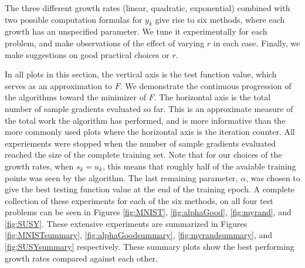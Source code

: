 \documentclass[11pt]{article}
\begin{document}
   The three different growth rates (linear, quadratic, exponential) combined with two possible computation formulas for $y_k$ give rise to six methods, where each growth has an unspecified parameter. We tune it experimentally for each problem, and make observations of the effect of varying $r$ in each case. Finally, we make suggestions on good practical choices or $r$. 
   
   In all plots in this section, the vertical axis is the test function value, which serves as an approximation to $F$. We demonstrate the continuous progression of the algorithms toward the minimizer of $F$. The horizontal axis is the total number of sample gradients evaluated so far. This is an approximate measure of the total work the algorithm has performed, and is more informative than the more commonly used plots where the horizontal axis is the iteration counter. All experiements were stopped when the number of sample gradients evaluated reached the size of the complete training set. Note that for our choices of the growth rates, when $s_k=u_k$, this means that roughly half of the avaiable training points was seen by the algorithm. 
  The last remaining parameter, $\alpha$, was chosen to give the best testing function value at the end of the training epoch. A complete collection of these experiments for each of the six methods, on all four test problems can be seen in Figures \ref{fig:MNIST}, \ref{fig:alphaGood}, \ref{fig:myrand}, and \ref{fig:SUSY}. These extensive experiments are summarized in Figures \ref{fig:MNISTsummary}, \ref{fig:alphaGoodsummary}, \ref{fig:myrandsummary}, and \ref{fig:SUSYsummary} respectively. These summary plots show the best performing growth rates compared against each other. 

   
\end{document}
